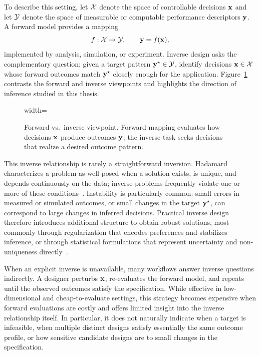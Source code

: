 To describe this setting, let $\mathcal{X}$ denote the space of controllable decisions $\mathbf{x}$ and let $\mathcal{Y}$ denote the space of measurable or computable performance descriptors $\mathbf{y}$. A forward model provides a mapping
\begin{equation}
  f:\mathcal{X} \to \mathcal{Y},\qquad \mathbf{y}=f(\mathbf{x}),
\end{equation}
implemented by analysis, simulation, or experiment. Inverse design asks the complementary question: given a target pattern $\mathbf{y}^{\star}\in\mathcal{Y}$, identify decisions $\mathbf{x}\in\mathcal{X}$ whose forward outcomes match $\mathbf{y}^{\star}$ closely enough for the application. Figure~\ref{fig:forward-inverse} contrasts the forward and inverse viewpoints and highlights the direction of inference studied in this thesis.

\begin{figure}[!htbp]
  \centering
  \begin{adjustbox}{width=\linewidth}
      
  \end{adjustbox}
  
  \caption[Forward and Inverse Design Mapping]{Forward vs.\ inverse viewpoint. Forward mapping evaluates how decisions $\mathbf{x}$ produce outcomes $\mathbf{y}$; the inverse task seeks decisions that realize a desired outcome pattern.}
  \label{fig:forward-inverse}
\end{figure}


This inverse relationship is rarely a straightforward inversion. Hadamard characterizes a problem as well posed when a solution exists, is unique, and depends continuously on the data; inverse problems frequently violate one or more of these conditions~\cite{KabanikhinSurvey}. Instability is particularly common: small errors in measured or simulated outcomes, or small changes in the target $\mathbf{y}^{\star}$, can correspond to large changes in inferred decisions. Practical inverse design therefore introduces additional structure to obtain robust solutions, most commonly through regularization that encodes preferences and stabilizes inference, or through statistical formulations that represent uncertainty and non-uniqueness directly~\cite{Stuart2010}.


When an explicit inverse is unavailable, many workflows answer inverse questions indirectly. A designer perturbs $\mathbf{x}$, re-evaluates the forward model, and repeats until the observed outcomes satisfy the specification. While effective in low-dimensional and cheap-to-evaluate settings, this strategy becomes expensive when forward evaluations are costly and offers limited insight into the inverse relationship itself. In particular, it does not naturally indicate when a target is infeasible, when multiple distinct designs satisfy essentially the same outcome profile, or how sensitive candidate designs are to small changes in the specification.


